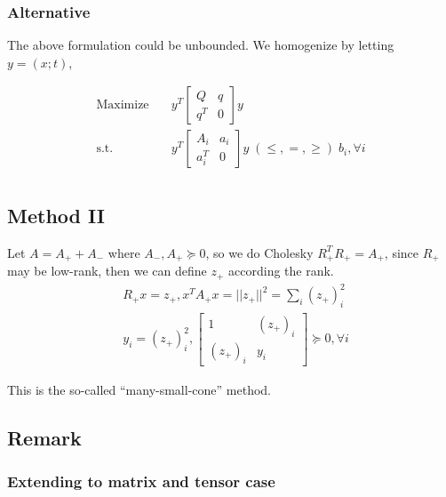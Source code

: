 \documentclass[../main]{subfiles}
\begin{document}
\subsubsection*{Alternative}
The above formulation could be unbounded. We homogenize by letting \(y = (x; t)\),

\begin{equation}
    \begin{aligned}
        \mathrm{Maximize}\quad & y^T
        \begin{bmatrix} Q   & q \\ q^T & 0 \end{bmatrix}y                                                                    \\
        \mathrm{s.t.} \quad    & y^T  \begin{bmatrix} A_i   & a_i \\ a_i^T & 0 \end{bmatrix}y  \; (\le, =, \ge) \; b_i, \forall i \\
    \end{aligned}
\end{equation}



\subsection{Method II}\label{sdp-method-2}
Let \(A = A_+ + A_-\) where \(A_-, A_+ \succeq 0\), so we do Cholesky \(R_+^T R_+ = A_+\), since $R_+$ may be low-rank,
then we can define $z_+$ according the rank.
\begin{equation}
    \begin{aligned}
         & R_+ x = z_+, x^TA_+ x = ||z_+||^2 = \sum_i (z_+)_i^2             \\
         & y_i = (z_+)_i^2, \begin{bmatrix} 1 & (z_+)_i \\ (z_+)_i & y_i \end{bmatrix} \succeq 0, \forall i
    \end{aligned}
\end{equation}

This is the so-called ``many-small-cone'' method.
\subsection{Remark}
\subsubsection{Extending to matrix and tensor case}\label{sdp-extending}
\end{document}
